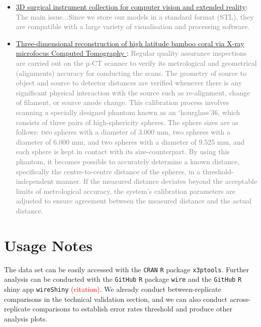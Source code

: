 \documentclass[fleqn,10pt]{wlscirep}
\begin{document}
\begin{itemize}
\begin{itemize}
\begin{itemize}
      \item
      \href{https://www.nature.com/articles/s41597-023-02684-0?_gl=1*1t69zgo*_up*MQ..&gclid=EAIaIQobChMInOXO84DVhgMViewWBR3vWQJAEAAYASAAEgJICfD_BwE#Sec12}{3D surgical instrument collection for computer vision and extended reality}: \textcolor{gray}{The main issue...Since we store our models in a standard format (STL), they are compatible with a large variety of visualisation and processing software.}
      
      \item
      \href{https://www.nature.com/articles/s41597-024-03396-9?_gl=1*1ikco52*_up*MQ..&gclid=EAIaIQobChMInOXO84DVhgMViewWBR3vWQJAEAAYASAAEgJICfD_BwE#Sec4}{Three-dimensional reconstruction of high latitude bamboo coral via X-ray microfocus Computed Tomography
}: \textcolor{gray}{Regular quality assurance inspections are carried out on the µ-CT scanner to verify its metrological and geometrical (alignments) accuracy for conducting the scans. The geometry of source to object and source to detector distances are verified whenever there is any significant physical interaction with the source such as re-alignment, change of filament, or source anode change. This calibration process involves scanning a specially designed phantom known as an ‘hourglass’36, which consists of three pairs of high-sphericity spheres. The sphere sizes are as follows: two spheres with a diameter of 3.000 mm, two spheres with a diameter of 6.000 mm, and two spheres with a diameter of 9.525 mm, and each sphere is kept in contact with its size-counterpart. By using this phantom, it becomes possible to accurately determine a known distance, specifically the centre-to-centre distance of the spheres, in a threshold-independent manner. If the measured distance deviates beyond the acceptable limits of metrological accuracy, the system’s calibration parameters are adjusted to ensure agreement between the measured distance and the actual distance.}
      
      \end{itemize}
      
    \end{itemize}
  
\end{itemize}
\fi

\section*{Usage Notes}

The data set can be easily accessed with the \texttt{CRAN} \texttt{R}
package \texttt{x3ptools}. Further analysis can be conducted with the
\texttt{GitHub} \texttt{R} package \texttt{wire} and the \texttt{GitHub}
\texttt{R} shiny app \texttt{wireShiny} \textcolor{red}{(citation)}. We
already conduct between-replicate comparisons in the technical
validation section, and we can also conduct across-replicate comparisons
to establish error rates threshold and produce other analysis plots.
\end{document}
